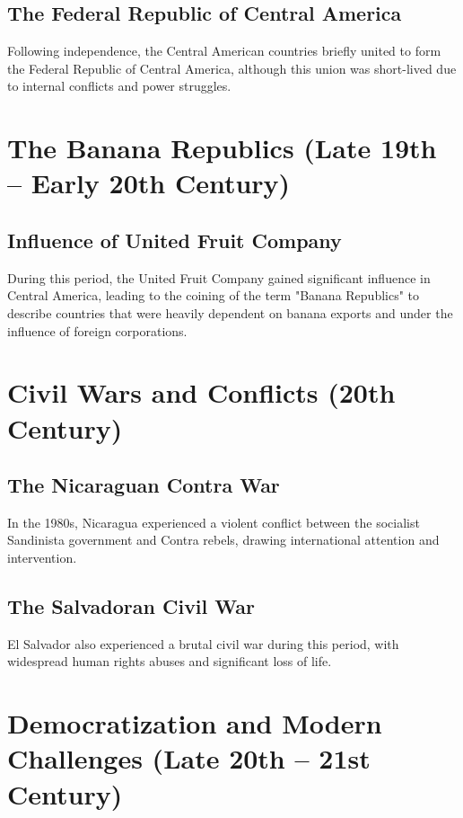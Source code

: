 \documentclass[a4paper,12pt]{book}
\begin{document}
\subsection{The Federal Republic of Central America}
\label{subsec:federal-republic}
Following independence, the Central American countries briefly united to form the Federal Republic of Central America, although this union was short-lived due to internal conflicts and power struggles.

\section{The Banana Republics (Late 19th – Early 20th Century)}
\label{sec:banana-republics}
\subsection{Influence of United Fruit Company}
\label{subsec:influence-united-fruit}
During this period, the United Fruit Company gained significant influence in Central America, leading to the coining of the term "Banana Republics" to describe countries that were heavily dependent on banana exports and under the influence of foreign corporations.

\section{Civil Wars and Conflicts (20th Century)}
\label{sec:civil-wars-conflicts}
\subsection{The Nicaraguan Contra War}
\label{subsec:nicaraguan-contra-war}
In the 1980s, Nicaragua experienced a violent conflict between the socialist Sandinista government and Contra rebels, drawing international attention and intervention.

\subsection{The Salvadoran Civil War}
\label{subsec:salvadoran-civil-war}
El Salvador also experienced a brutal civil war during this period, with widespread human rights abuses and significant loss of life.

\section{Democratization and Modern Challenges (Late 20th – 21st Century)}
\label{sec:democratization-modern-challenges}
\end{document}
